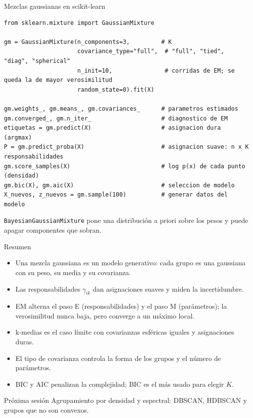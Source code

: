 \documentclass[aspectratio=169,11pt]{beamer}
\begin{document}
\begin{frame}[fragile]{Mezclas gaussianas en scikit-learn}
\begin{lstlisting}
from sklearn.mixture import GaussianMixture

gm = GaussianMixture(n_components=3,         # K
                     covariance_type="full",  # "full", "tied", "diag", "spherical"
                     n_init=10,               # corridas de EM; se queda la de mayor verosimilitud
                     random_state=0).fit(X)

gm.weights_, gm.means_, gm.covariances_      # parametros estimados
gm.converged_, gm.n_iter_                    # diagnostico de EM
etiquetas = gm.predict(X)                    # asignacion dura (argmax)
P = gm.predict_proba(X)                      # asignacion suave: n x K responsabilidades
gm.score_samples(X)                          # log p(x) de cada punto (densidad)
gm.bic(X), gm.aic(X)                         # seleccion de modelo
X_nuevos, z_nuevos = gm.sample(100)          # generar datos del modelo
\end{lstlisting}
  {\small \texttt{BayesianGaussianMixture} pone una distribución a priori sobre los pesos
  y puede apagar componentes que sobran.}
\end{frame}



\begin{frame}{Resumen}
  \begin{itemize}
    \item Una mezcla gaussiana es un modelo generativo: cada grupo es una gaussiana con su
          peso, su media y su covarianza.
    \item Las responsabilidades $\gamma_{ik}$ dan asignaciones suaves y miden la incertidumbre.
    \item EM alterna el paso E (responsabilidades) y el paso M (parámetros); la verosimilitud
          nunca baja, pero converge a un máximo local.
    \item k-medias es el caso límite con covarianzas esféricas iguales y asignaciones duras.
    \item El tipo de covarianza controla la forma de los grupos y el número de parámetros.
    \item BIC y AIC penalizan la complejidad; BIC es el más usado para elegir $K$.
  \end{itemize}
  \vspace{6pt}
  \begin{block}{Próxima sesión}
    Agrupamiento por densidad y espectral: DBSCAN, HDBSCAN y grupos que no son convexos.
  \end{block}
\end{frame}
\end{document}
